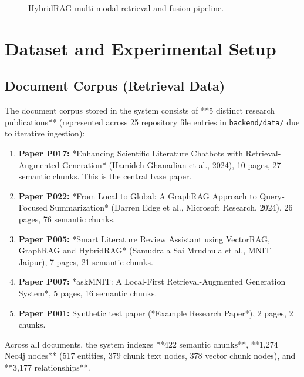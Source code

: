\documentclass[conference]{IEEEtran}
\begin{document}
\begin{figure}[t]
\centering
{}
\caption{HybridRAG multi-modal retrieval and fusion pipeline.}
\label{fig:hybrid}
\end{figure}


\section{Dataset and Experimental Setup}

\subsection{Document Corpus (Retrieval Data)}
The document corpus stored in the system consists of **5 distinct research publications** (represented across 25 repository file entries in \texttt{backend/data/} due to iterative ingestion):
\begin{enumerate}
\item \textbf{Paper P017:} *Enhancing Scientific Literature Chatbots with Retrieval-Augmented Generation* (Hamideh Ghanadian et al., 2024), 10 pages, 27 semantic chunks. This is the central base paper.
\item \textbf{Paper P022:} *From Local to Global: A GraphRAG Approach to Query-Focused Summarization* (Darren Edge et al., Microsoft Research, 2024), 26 pages, 76 semantic chunks.
\item \textbf{Paper P005:} *Smart Literature Review Assistant using VectorRAG, GraphRAG and HybridRAG* (Samudrala Sai Mrudhula et al., MNIT Jaipur), 7 pages, 21 semantic chunks.
\item \textbf{Paper P007:} *askMNIT: A Local-First Retrieval-Augmented Generation System*, 5 pages, 16 semantic chunks.
\item \textbf{Paper P001:} Synthetic test paper (*Example Research Paper*), 2 pages, 2 chunks.
\end{enumerate}
Across all documents, the system indexes **422 semantic chunks**, **1,274 Neo4j nodes** (517 entities, 379 chunk text nodes, 378 vector chunk nodes), and **3,177 relationships**.
\end{document}
